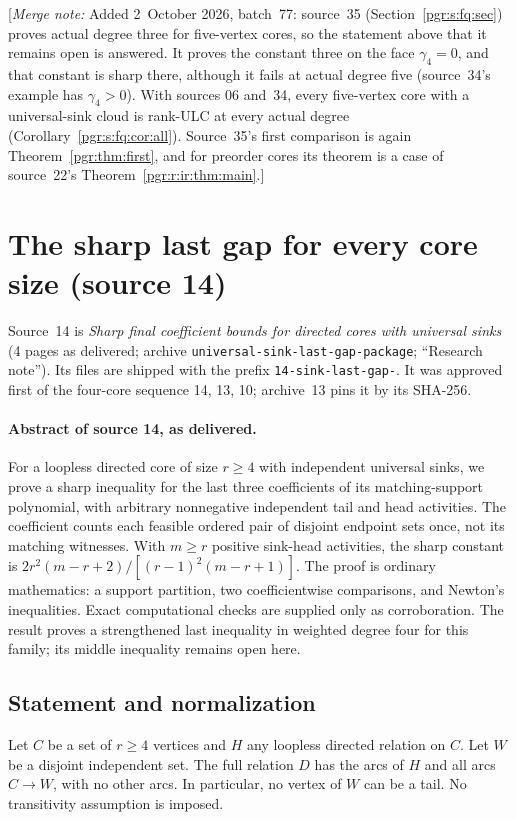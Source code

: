 \documentclass[11pt]{article}
\numberwithin{equation}{section}
\theoremstyle{definition}\newtheorem{definition}[theorem]{Definition}\newtheorem{remark}[theorem]{Remark}
\newcommand{\mnote}[1]{[\textit{Merge note:} #1]}
\begin{document}
\mnote{Added 2~October 2026, batch~77: source~35
(Section~\ref{pgr:s:fq:sec}) proves actual degree three for five-vertex
cores, so the statement above that it remains open is answered. It proves
the constant three on the face $\gamma_4=0$, and that constant is sharp
there, although it fails at actual degree five (source~34's example has
$\gamma_4>0$). With sources 06 and~34, every five-vertex core with a
universal-sink cloud is rank-ULC at every actual degree
(Corollary~\ref{pgr:s:fq:cor:all}). Source~35's first comparison is again
Theorem~\ref{pgr:thm:first}, and for preorder cores its theorem is a
case of source~22's Theorem~\ref{pgr:r:ir:thm:main}.}

\section{The sharp last gap for every core size (source 14)}\label{pgr:s:lg:sec}

Source~14 is \emph{Sharp final coefficient bounds for directed cores with
universal sinks} (4 pages as delivered; archive
\texttt{universal-sink-last-gap-package}; ``Research note''). Its files are
shipped with the prefix \texttt{14-sink-last-gap-}. It was approved first of
the four-core sequence 14, 13, 10; archive~13 pins it by its SHA-256.

\paragraph{Abstract of source 14, as delivered.}

For a loopless directed core of size $r\ge4$ with independent universal sinks, we prove a sharp inequality for the last three coefficients of its matching-support polynomial, with arbitrary nonnegative independent tail and head activities. The coefficient counts each feasible ordered pair of disjoint endpoint sets once, not its matching witnesses. With $m\ge r$ positive sink-head activities, the sharp constant is $2r^2(m-r+2)/[(r-1)^2(m-r+1)]$. The proof is ordinary mathematics: a support partition, two coefficientwise comparisons, and Newton's inequalities. Exact computational checks are supplied only as corroboration. The result proves a strengthened last inequality in weighted degree four for this family; its middle inequality remains open here.

\subsection{Statement and normalization}
Let $C$ be a set of $r\ge4$ vertices and $H$ any loopless directed relation on $C$. Let $W$ be a disjoint independent set. The full relation $D$ has the arcs of $H$ and all arcs $C\to W$, with no other arcs. In particular, no vertex of $W$ can be a tail. No transitivity assumption is imposed.
\end{document}
